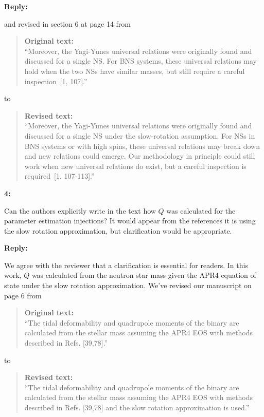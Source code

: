 \documentclass[11pt]{article}
\newenvironment{reviewercomment}[1]{
    \vspace{1em}
    \noindent \textbf{#1:} \itshape
}{
    \par\vspace{0.5em}
}
\newenvironment{authorresponse}{
    \noindent \textbf{Reply:} \normalfont
}{
    \par\vspace{1.5em}
}
\newenvironment{originaltext}{
    \begin{quote}
    \color{oldcolor} \small \textbf{Original text:} \\
}{
    \end{quote}
}
\newenvironment{revisedtext}{
    \begin{quote}
    \color{revcolor} \small \textbf{Revised text:} \\
}{
    \end{quote}
}
\begin{document}
\begin{authorresponse}
    and revised in section 6 at page 14 from
    \begin{originaltext}
        ``Moreover, the Yagi-Yunes
        universal relations were originally found and discussed for a single NS. For BNS
        systems, these universal relations may hold when the two NSs have similar
        masses, but still require a careful inspection~[1, 107].''
    \end{originaltext}
    to
    \begin{revisedtext}
        ``Moreover, the Yagi-Yunes
        universal relations were originally found and discussed for a single NS under the slow-rotation assumption. 
        For NSs in BNS systems or with high spins, these universal relations may break down and new relations could emerge. 
        Our methodology in principle could still work when new universal relations do exist, but a careful inspection is required~[1, 107-113].''
    \end{revisedtext}

\end{authorresponse}

\begin{reviewercomment}{4}
    Can the authors explicitly write in the text how $Q$ was calculated for the parameter estimation injections? It would appear from the references it is using the slow rotation approximation, but clarification would be appropriate. 
\end{reviewercomment}

\begin{authorresponse}
    We agree with the reviewer that a clarification is essential for readers. In
    this work, $Q$ was calculated from the neutron star mass given the APR4
    equation of state under the slow rotation approximation. We've revised our manuscript on page 6 from 
    \begin{originaltext}
        ``The tidal deformability and quadrupole moments of the binary
        are calculated from the stellar mass assuming the APR4 EOS with methods
        described in Refs. [39,78].'' 
    \end{originaltext}
    to 
    \begin{revisedtext}
        ``The tidal deformability and quadrupole moments of the binary
        are calculated from the stellar mass assuming the APR4 EOS with methods
        described in Refs. [39,78] and the slow rotation approximation is used.''
    \end{revisedtext}
\end{authorresponse}
\end{document}
